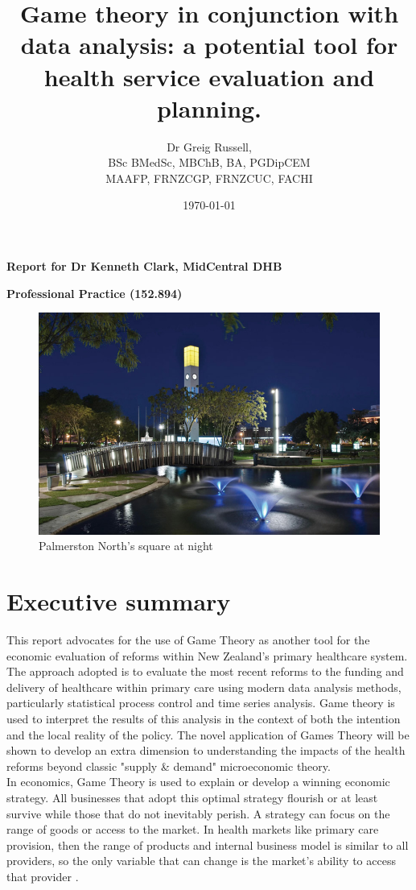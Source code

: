 \documentclass[11pt,a4paper]{article}
\title{\textbf{Game theory in conjunction with data analysis: a potential tool for health service evaluation and planning.}}
\author{Dr Greig Russell, \\ BSc BMedSc, MBChB, BA, PGDipCEM \\ MAAFP, FRNZCGP, FRNZCUC, FACHI}
\date{\today}
\begin{document}
\maketitle
\Large{\textbf{Report for Dr Kenneth Clark, MidCentral DHB}}

\Large{\textbf{Professional Practice (152.894)}}
\newline
\newline
\newline
\begin{figure}[htp]
\centering
\includegraphics[scale=0.6]{PN.png}
\caption{Palmerston North's square at night}
\label{}
\end{figure}

\pagebreak
\section{Executive summary}
This report advocates for the use of Game Theory as another tool for the economic evaluation of reforms within New Zealand's primary healthcare system. The approach adopted is to evaluate the most recent reforms to the funding and delivery of healthcare within primary care using modern data analysis methods, particularly statistical process control and time series analysis. Game theory is used to interpret the results of this analysis in the context of both the intention and the local reality of the policy. The novel application of Games Theory will be shown to develop an extra dimension to understanding the impacts of the health reforms beyond classic "supply \& demand" microeconomic theory.\\

In economics, Game Theory is used to explain or develop a winning economic strategy. All businesses that adopt this optimal strategy flourish or at least survive while those that do not inevitably perish. A strategy can focus on the range of goods or access to the market. In health markets like primary care provision, then the range of products and internal business model is similar to all providers, so the  only variable that can change is the market's ability to access that provider \citep{dinar2008game}. \\
\end{document}
